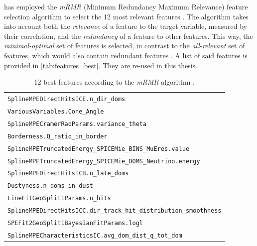 \citeauthor{dsea_jan} has employed the \emph{mRMR} (Minimum Redundancy Maximum Relevance) feature selection algorithm \cite{mrmr}
to select the 12 most relevant features \cite{dsea_jan}.
The algorithm takes into account both
  the \emph{relevance} of a feature to the target variable,
    measured by their correlation,
  and the \emph{redundancy} of a feature to other features.
This way,
the \emph{minimal-optimal} set of features is selected,
  in contrast to the \emph{all-relevant} set of features,
    which would also contain redundant features \citationneeded{}. %
A list of said features is provided in \autoref{tab:features_best}.
They are re-used in this thesis.

\begin{table}
    \centering
    \caption{
      12 best features according to the \emph{mRMR} algorithm \cite{dsea_jan}.
    }
    \label{tab:features_best}
    \begin{tabular}{l}
        \toprule
        \texttt{SplineMPEDirectHitsICE.n\_dir\_doms} \\
        \texttt{VariousVariables.Cone\_Angle} \\
        \texttt{SplineMPECramerRaoParams.variance\_theta} \\
        \texttt{Borderness.Q\_ratio\_in\_border} \\
        \texttt{SplineMPETruncatedEnergy\_SPICEMie\_BINS\_MuEres.value} \\
        \texttt{SplineMPETruncatedEnergy\_SPICEMie\_DOMS\_Neutrino.energy} \\
        \texttt{SplineMPEDirectHitsICB.n\_late\_doms} \\
        \texttt{Dustyness.n\_doms\_in\_dust} \\
        \texttt{LineFitGeoSplit1Params.n\_hits} \\
        \texttt{SplineMPEDirectHitsICC.dir\_track\_hit\_distribution\_smoothness} \\
        \texttt{SPEFit2GeoSplit1BayesianFitParams.logl} \\
        \texttt{SplineMPECharacteristicsIC.avg\_dom\_dist\_q\_tot\_dom} \\
        \bottomrule
    \end{tabular}
\end{table}


